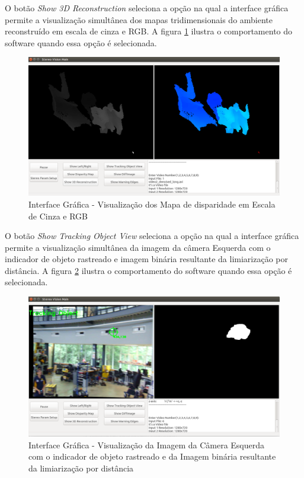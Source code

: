 O botão \textit{Show 3D Reconstruction} seleciona a opção na qual a interface gráfica permite a visualização simultânea dos mapas tridimensionais do ambiente reconstruído em escala de cinza e 
RGB. A figura \ref{gui_show3dreconstruction_view} ilustra o comportamento do software quando essa opção é selecionada. 

\begin{figure}[H]
 	\centering
 	\includegraphics[scale=0.35]{./Resources/gui_show3dreconstruction_view.png}
 	\caption{Interface Gráfica - Visualização dos Mapa de disparidade em Escala de Cinza e RGB}
 	\label{gui_show3dreconstruction_view}
\end{figure}

O botão \textit{Show Tracking Object View} seleciona a opção na qual a interface gráfica permite a visualização simultânea da imagem da câmera Esquerda com o indicador de objeto rastreado e 
imagem binária resultante da limiarização por distância. A figura \ref{gui_show_tracking_object_view} ilustra o comportamento do software quando essa opção é selecionada. 

\begin{figure}[H]
 	\centering
 	\includegraphics[scale=0.35]{./Resources/gui_show_tracking_object_view.png}
 	\caption{Interface Gráfica - Visualização da Imagem da Câmera Esquerda com o indicador de objeto rastreado e da Imagem binária resultante da limiarização por distância}
 	\label{gui_show_tracking_object_view}
\end{figure}

